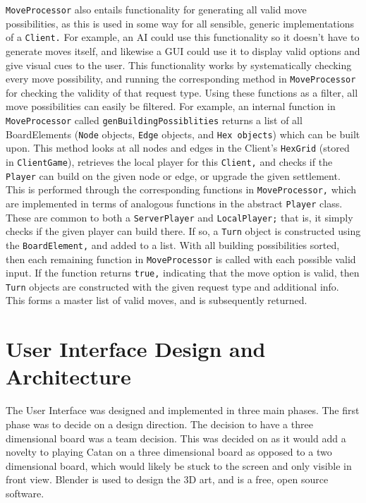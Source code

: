 \documentclass[a4paper,doc]{apa6}
\newcommand{\code}{\texttt}
\begin{document}
\code{MoveProcessor} also entails functionality for generating all valid move possibilities, as this is used in some way for all sensible, generic implementations of a \code{Client.} For example, an AI could use this functionality so it doesn’t have to generate moves itself, and likewise a GUI could use it to display valid options and give visual cues to the user. This functionality works by systematically checking every move possibility, and running the corresponding method in \code{MoveProcessor} for checking the  validity of that request type. Using these functions as a filter, all move possibilities can easily be filtered. For example, an internal function in \code{MoveProcessor} called \code{genBuildingPossiblities} returns a list of all BoardElements (\code{Node} objects, \code{Edge} objects, and \code{Hex objects}) which can be built upon. This method looks at all nodes and edges in the Client’s \code{HexGrid} (stored in \code{ClientGame}), retrieves the local player for this \code{Client,} and checks if the \code{Player} can build on the given node or edge, or upgrade the given settlement. This is performed through the corresponding functions in \code{MoveProcessor,} which are implemented in terms of analogous functions in the abstract \code{Player} class. These are common to both a \code{ServerPlayer} and \code{LocalPlayer;} that is, it simply checks if the given player can build there. If so, a \code{Turn} object is constructed using the \code{BoardElement,} and added to a list. With all building possibilities sorted, then each remaining function in \code{MoveProcessor} is called with each possible valid input. If the function returns \code{true,} indicating that the move option is valid, then \code{Turn} objects are constructed with the given request type and additional info. This forms a master list of valid moves, and is subsequently returned.

\section{User Interface Design and Architecture}


The User Interface was designed and implemented in three main phases. The first phase was to decide on a design direction. The decision to have a three dimensional board was a team decision. This was decided on as it would add a novelty to playing Catan on a three dimensional board as opposed to a two dimensional board, which would likely be stuck to the screen and only visible in front view. Blender is used to design the 3D art, and is a free, open source software.
\end{document}
